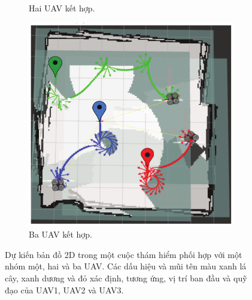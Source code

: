 \documentclass[11pt,openany]{book}
\begin{document}
\begin{figure}[H]
\begin{subfigure}[H]{0.5\linewidth}
        \caption{{Hai UAV kết hợp.}}
        \label{fig:3.16b}
    \end{subfigure}
    \begin{subfigure}[H]{0.5\linewidth}
        \includegraphics[width=\linewidth]{assets/3_16_c.png}
        \caption{{Ba UAV kết hợp.}}
        \label{fig:3.16c}
    \end{subfigure}
    \caption{Dự kiến bản đồ 2D trong một cuộc thám hiểm phối hợp với một nhóm một, hai và ba UAV. Các dấu hiệu và mũi tên màu xanh lá cây, xanh dương và đỏ xác định, tương ứng, vị trí ban đầu và quỹ đạo của UAV1, UAV2 và UAV3.}
    \label{fig:3.16}
\end{figure}
\end{document}
